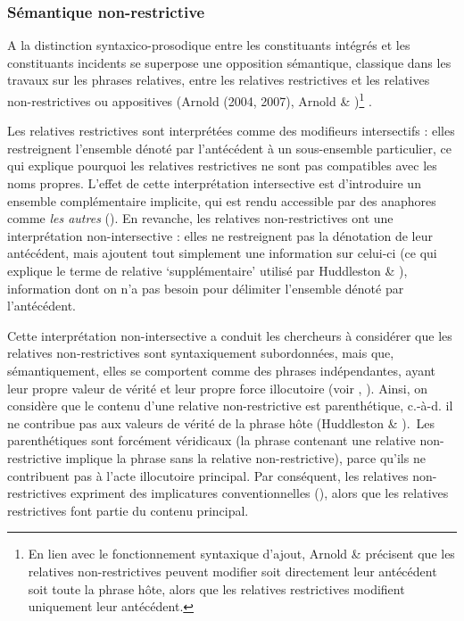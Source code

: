 \subsubsection{Sémantique non-restrictive}
\label{bkm:Ref295412149}A la distinction syntaxico-prosodique entre les constituants intégrés et les constituants incidents se superpose une opposition sémantique, classique dans les travaux sur les phrases relatives, entre les relatives restrictives et les relatives non-restrictives ou appositives (Arnold (2004, 2007), Arnold \& \citet{Borsley2008})\footnote{En lien avec le fonctionnement syntaxique d'ajout, Arnold \& \citet{Borsley2008} précisent que les relatives non-restrictives peuvent modifier soit directement leur antécédent soit toute la phrase hôte, alors que les relatives restrictives modifient uniquement leur antécédent. } . 

Les relatives restrictives sont interprétées comme des modifieurs intersectifs : elles restreignent l'ensemble dénoté par l'antécédent à un sous-ensemble particulier, ce qui explique pourquoi les relatives restrictives ne sont pas compatibles avec les noms propres. L'effet de cette interprétation intersective est d'introduire un ensemble complémentaire implicite, qui est rendu accessible par des anaphores comme \textit{les autres} (\citet{Arnold2004}). En revanche, les relatives non-restrictives ont une interprétation non-intersective : elles ne restreignent pas la dénotation de leur antécédent, mais ajoutent tout simplement une information sur celui-ci (ce qui explique le terme de relative `supplémentaire' utilisé par Huddleston \& \citet{Pullum2002}), information dont on n'a pas besoin pour délimiter l'ensemble dénoté par l'antécédent.

Cette interprétation non-intersective a conduit les chercheurs à considérer que les relatives non-restrictives sont syntaxiquement subordonnées, mais que, sémantiquement, elles se comportent comme des phrases indépendantes, ayant leur propre valeur de vérité et leur propre force illocutoire (voir \citet{Peterson2004b}, \citet{Arnold2004}). Ainsi, on considère que le contenu d'une relative non-restrictive est parenthétique, c.-à-d. il ne contribue pas aux valeurs de vérité de la phrase hôte (Huddleston \& \citet{Pullum2002}).~Les parenthétiques sont forcément véridicaux (la phrase contenant une relative non-restrictive implique la phrase sans la relative non-restrictive), parce qu'ils ne contribuent pas à l'acte illocutoire principal. Par conséquent, les relatives non-restrictives expriment des implicatures conventionnelles (\citet{Potts2005}), alors que les relatives restrictives font partie du contenu principal.

